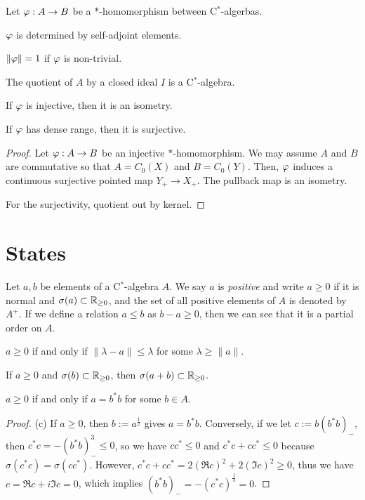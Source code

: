 \documentclass{../../large}
\begin{document}
\begin{prb}[$*$-homomorphisms]
Let $\varphi:A\to B$ be a $*$-homomorphism between C$^*$-algerbas.
\begin{parts}
\item $\varphi$ is determined by self-adjoint elements.
\item $\|\varphi\|=1$ if $\varphi$ is non-trivial.
\item The quotient of $A$ by a closed ideal $I$ is a C$^*$-algebra.
\item If $\varphi$ is injective, then it is an isometry.
\item If $\varphi$ has dense range, then it is surjective.
\end{parts}
\end{prb}
\begin{proof}

Let $\varphi:A\to B$ be an injective $*$-homomorphism.
We may assume $A$ and $B$ are commutative so that $A=C_0(X)$ and $B=C_0(Y)$.
Then, $\varphi$ induces a continuous surjective pointed map $Y_+\to X_+$.
The pullback map is an isometry.

For the surjectivity, quotient out by kernel.
\end{proof}





\section{States}


\begin{prb}
Let $a,b$ be elements of a C$^*$-algebra $A$.
We say $a$ is \emph{positive} and write $a\ge0$ if it is normal and $\sigma(a)\subset\mathbb{R}_{\ge0}$, and the set of all positive elements of $A$ is denoted by $A^+$.
If we define a relation $a\le b$ as $b-a\ge0$, then we can see that it is a partial order on $A$.
\begin{parts}
\item $a\ge0$ if and only if $\|\lambda-a\|\le\lambda$ for some $\lambda\ge\|a\|$.
\item If $a\ge0$ and $\sigma(b)\subset\mathbb{R}_{\ge0}$, then $\sigma(a+b)\subset\mathbb{R}_{\ge0}$.
\item $a\ge0$ if and only if $a=b^*b$ for some $b\in A$.
\end{parts}
\end{prb}
\begin{proof}
(c)
If $a\ge0$, then $b:=a^{\frac12}$ gives $a=b^*b$.
Conversely, if we let $c:=b(b^*b)_-$, then $c^*c=-(b^*b)_-^3\le0$, so we have $cc^*\le0$ and $c^*c+cc^*\le0$ because $\sigma(c^*c)=\sigma(cc^*)$.
However, $c^*c+cc^*=2(\Re c)^2+2(\Im c)^2\ge0$, thus we have $c=\Re c+i\Im c=0$, which implies $(b^*b)_-=-(c^*c)^{\frac13}=0$.
\end{proof}
\end{document}
